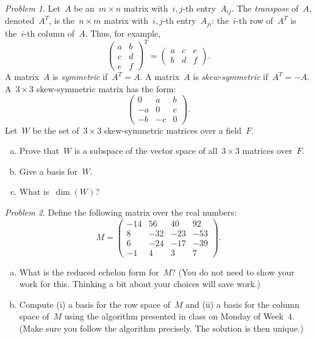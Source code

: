\documentclass[11pt,twoside]{amsart}
\theoremstyle{plain}
\theoremstyle{remark}
\newtheorem{prob}{Problem}
\theoremstyle{definition}
\theoremstyle{definition}
\begin{document}
\begin{prob}
Let~$A$ be an~$m\times n$ matrix with~$i,j$-th entry~$A_{ij}$.
    The {\em transpose} of~$A$, denoted~$A^{T}$, is the~$n\times m$ matrix
    with~$i,j$-th entry~$A_{ji}$: the~$i$-th row of~$A^{T}$ is the~$i$-th column
    of~$A$.  Thus, for example,
    \[
      \left(\begin{array}{cc}
    a&b\\
    c&d\\
    e&f
      \end{array} \right)^{T}
=
\left(\begin{array}{ccc}
    a&c&e\\
    b&d&f
\end{array} \right).
    \]
    A matrix~$A$ is {\em symmetric} if~$A^{T}=A$.  A matrix~$A$ is {\em skew-symmetric} if~$A^{T}=-A$.  A~$3\times 3$ skew-symmetric matrix has the form:
    \[
      \left(\begin{array}{rrr}
    0&a&b\\
    -a&0&c\\
    -b&-c&0
      \end{array} \right).
    \]
    Let~$W$ be the set of~$3\times 3$ skew-symmetric matrices over a
    field~$F$.
    \begin{enumerate}[(a)]
      \item Prove that~$W$ is a subspace of the vector space of all~$3\times 3$ matrices
  over~$F$.
      \item Give a basis for~$W$.
      \item What is~$\dim(W)$?
    \end{enumerate}
\end{prob}

\begin{prob}
Define the following matrix over the real numbers:
    \[
      M = 
      \left(\begin{array}{rrrr}
    -14 & 56 & 40 & 92 \\
    8 & -32 & -23 & -53 \\
    6 & -24 & -17 & -39 \\
    -1 & 4 & 3 & 7
      \end{array}\right).
    \]
    \begin{enumerate}[(a)]
      \item What is the reduced echelon form for~$M$? (You do not need to show
  your work for this.  Thinking a bit about your choices will save work.)
  \item Compute (i) a basis for the row space of~$M$ and (ii) a basis for
    the column space of~$M$ using the algorithm presented in class on
    Monday of Week~$4$. (Make sure you follow the algorithm precisely. The
    solution is then unique.)
    \end{enumerate}
\end{prob}
\end{document}
